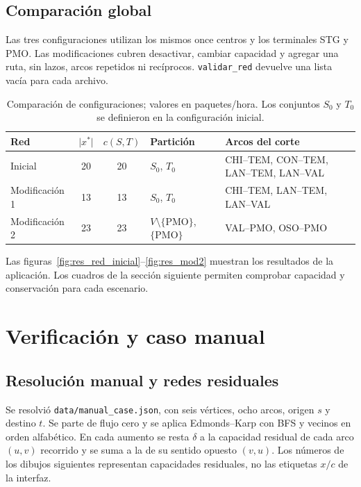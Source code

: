\documentclass[12pt, a4paper]{article}
\begin{document}
\subsection{Comparación global}
Las tres configuraciones utilizan los mismos once centros y los terminales STG y PMO. Las modificaciones cubren desactivar, cambiar capacidad y agregar una ruta, sin lazos, arcos repetidos ni recíprocos. \texttt{validar\_red} devuelve una lista vacía para cada archivo.
\begin{table}[H]
  \centering
  \small
  \begin{tabular}{lcc>{\raggedright\arraybackslash}p{4.1cm}>{\raggedright\arraybackslash}p{4.0cm}}
    \toprule
    Red & $\lvert x^*\rvert$ & $c(S,T)$ & Partición & Arcos del corte \\
    \midrule
    Inicial & 20 & 20 & $S_0$, $T_0$ & CHI--TEM, CON--TEM, LAN--TEM, LAN--VAL \\
    Modificación 1 & 13 & 13 & $S_0$, $T_0$ & CHI--TEM, LAN--TEM, LAN--VAL \\
    Modificación 2 & 23 & 23 & $V\setminus\{\text{PMO}\}$, $\{\text{PMO}\}$ & VAL--PMO, OSO--PMO \\
    \bottomrule
  \end{tabular}
  \caption{Comparación de configuraciones; valores en paquetes/hora. Los conjuntos $S_0$ y $T_0$ se definieron en la configuración inicial.}
  \label{tab:comparacion}
\end{table}
Las figuras~\ref{fig:res_red_inicial}--\ref{fig:res_mod2} muestran los resultados de la aplicación. Los cuadros de la sección siguiente permiten comprobar capacidad y conservación para cada escenario.

\section{Verificación y caso manual}

\subsection{Resolución manual y redes residuales}
Se resolvió \texttt{data/manual\_case.json}, con seis vértices, ocho arcos, origen $s$ y destino $t$. Se parte de flujo cero y se aplica Edmonds--Karp con BFS y vecinos en orden alfabético. En cada aumento se resta $\delta$ a la capacidad residual de cada arco $(u,v)$ recorrido y se suma a la de su sentido opuesto $(v,u)$. Los números de los dibujos siguientes representan capacidades residuales, no las etiquetas $x/c$ de la interfaz.
\end{document}
